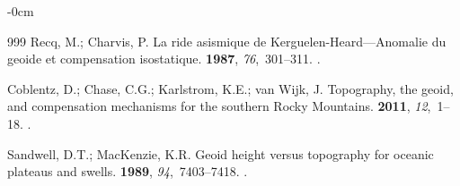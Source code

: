\documentclass[geomatics,article,accept,pdftex,moreauthors]{Definitions/mdpi}
\begin{document}
\begin{adjustwidth}{-\extralength}{0cm}
\begin{thebibliography}{999}
Recq, M.; Charvis, P.
\newblock La ride asismique de Kerguelen-Heard---Anomalie du geoide et
  compensation isostatique.
 {\bf 1987}, {\em 76},~301--311.
.

Coblentz, D.; Chase, C.G.; Karlstrom, K.E.; van Wijk, J.
\newblock Topography, the geoid, and compensation mechanisms for the southern
  Rocky Mountains.
 {\bf 2011}, \emph{12},~1--18. %
.

Sandwell, D.T.; MacKenzie, K.R.
\newblock Geoid height versus topography for oceanic plateaus and swells.
 {\bf 1989}, {\em
  94},~7403--7418.
.

\end{thebibliography}
\PublishersNote{}
\end{adjustwidth}
\end{document}
